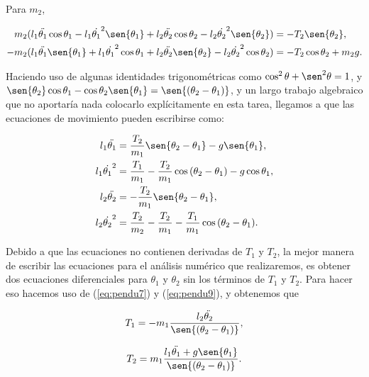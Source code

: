 \documentclass[a4paper,10pt]{article}
\numberwithin{equation}{section}
\begin{document}
Para $m_2$,

\begin{align}
 m_2(l_1\ddot{\theta_1}\cos{\theta_1} - l_1\dot{\theta_1}^2\sen{\theta_1} + l_2\ddot{\theta_2}\cos{\theta_2} - l_2\dot{\theta_2}^2\sen{\theta_2})
 &= - T_2 \sen{\theta_2}, \\
 - m_2(l_1\ddot{\theta_1}\sen{\theta_1} + l_1\dot{\theta_1}^2\cos{\theta_1} + l_2\ddot{\theta_2}\sen{\theta_2} - l_2\dot{\theta_2}^2\cos{\theta_2})
 &= - T_2 \cos{\theta_2} + m_2 g.
\end{align}

Haciendo uso de algunas identidades trigonométricas como $\cos^2{\theta} +  \sen^2{\theta} = 1$, y
$\sen{\theta_2}\cos{\theta_1} - \cos{\theta_2}\sen{\theta_1} = \sen{(\theta_2 - \theta_1)}$, 
y un largo trabajo algebraico que no aportaría nada colocarlo explícitamente en esta tarea,
llegamos a que las ecuaciones de movimiento pueden escribirse como:

\begin{align}
  \label{eq:pendu7} %
 l_1\ddot{\theta_1} &= \frac{T_2}{m_1}\sen{\theta_2 - \theta_1} - g \sen{\theta_1}, \\
 \label{eq:pendu8} %
 l_1\dot{\theta_1}^2 &= \frac{T_1}{m_1} - \frac{T_2}{m_1}\cos{(\theta_2 - \theta_1)} - g \cos{\theta_1}, \\
  \label{eq:pendu9} %
 l_2\ddot{\theta_2} &= - \frac{T_2}{m_1}\sen{\theta_2 - \theta_1}, \\
  \label{eq:pendu10} %
 l_2\dot{\theta_2}^2 &= \frac{T_2}{m_2} - \frac{T_2}{m_1} - \frac{T_1}{m_1}\cos{(\theta_2 - \theta_1)}.
 \end{align}

Debido a que las ecuaciones no contienen derivadas de $T_1$ y $T_2$, la mejor manera 
de escribir las ecuaciones para el análisis numérico que realizaremos, es obtener 
dos ecuaciones diferenciales para $\theta_1$ y $\theta_2$ sin los términos de $T_1$
y $T_2$. Para hacer eso hacemos uso de (\ref{eq:pendu7}) y (\ref{eq:pendu9}), y 
obtenemos que 

\begin{equation}
 T_1 = - m_1 \frac{l_2\ddot{\theta_2}}{\sen{(\theta_2 - \theta_1)}},
\end{equation}

\begin{equation}
 T_2 = m_1 \frac{l_1 \ddot{\theta_1} + g \sen{\theta_1}}{\sen{(\theta_2 - \theta_1)}}.
\end{equation}
\end{document}
